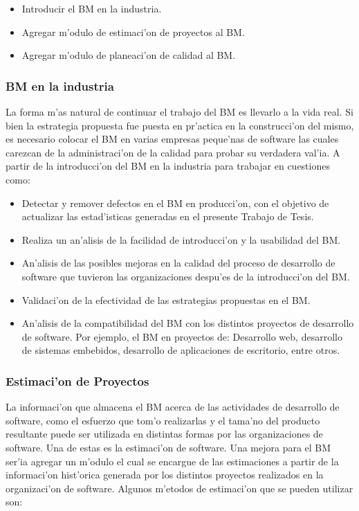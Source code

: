 \begin{itemize}
	\item Introducir el BM en la industria.
	\item Agregar m'odulo de estimaci'on de proyectos al BM.
	\item Agregar m'odulo de planeaci'on de calidad al BM.
\end{itemize}

\subsubsection{BM en la industria}
\label{sec:BMenlaindustria}
\noindent
La forma m'as natural de continuar el trabajo del BM es llevarlo a la vida real. Si bien la estrategia propuesta fue puesta en pr'actica en la construcci'on del mismo, es necesario colocar el BM en varias empresas peque'nas de software las cuales carezcan de la administraci'on de la calidad para probar su verdadera val'ia. A partir de la introducci'on del BM en la industria para trabajar en cuestiones como:

\begin{itemize}
	\item Detectar y remover defectos en el BM en producci'on, con el objetivo de actualizar las estad'isticas generadas en el presente Trabajo de Tesis.
	\item Realiza un an'alisis de la facilidad de introducci'on y la usabilidad del BM.
	\item An'alisis de las posibles mejoras en la calidad del proceso de desarrollo de software que tuvieron las organizaciones despu'es de la introducci'on del BM.
	\item Validaci'on de la efectividad de las estrategias propuestas en el BM.
	\item An'alisis de la compatibilidad del BM con los distintos proyectos de desarrollo de software. Por ejemplo, el BM en proyectos de: Desarrollo web, desarrollo de sistemas embebidos, desarrollo de aplicaciones de escritorio, entre otros.
\end{itemize}

\subsubsection{Estimaci'on de Proyectos}
\label{sec:EstimaciondeProyectos}
\noindent
La informaci'on que almacena el BM acerca de las actividades de desarrollo de software, como el esfuerzo que tom'o realizarlas y el tama'no del producto resultante puede ser utilizada en distintas formas por las organizaciones de software. Una de estas es la estimaci'on de software. Una mejora para el BM ser'ia agregar un m'odulo el cual se encargue de las estimaciones a partir de la informaci'on hist'orica generada por los distintos proyectos realizados en la organizaci'on de software. Algunos m'etodos de estimaci'on que se pueden utilizar son:


